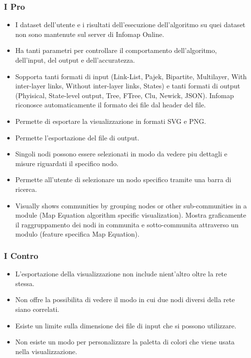 \documentclass[a4paper,12pt]{report}
\begin{document}
			\subsubsection*{I Pro}
				\begin{itemize}
					\item I dataset dell'utente e i risultati dell'esecuzione dell'algoritmo su quei dataset non sono mantenute sul server di Infomap Online.
					\item Ha tanti parametri per controllare il comportamento dell'algoritmo, dell'input, del output e dell'accuratezza.
					\item Sopporta tanti formati di input (Link-List, Pajek, Bipartite, Multilayer, With inter-layer links, Without inter-layer links, States) e tanti formati di output (Phyisical, State-level output, Tree, FTree, Clu, Newick, JSON). Infomap riconosce automaticamente il formato dei file dal header del file.
					\item Permette di esportare la visualizzazione in formati SVG e PNG.
					\item Permette l'esportazione del file di output.
					\item Singoli nodi possono essere selezionati in modo da vedere piu dettagli e misure riguardati il specifico nodo.
					\item Permette all'utente di selezionare un nodo specifico tramite una barra di ricerca.
					\item Visually shows communities by grouping nodes or other sub-communities in a module (Map Equation algorithm specific visualization). Mostra graficamente il raggruppamento dei nodi in communita e sotto-communita attraverso un modulo (feature specifica Map Equation).
				\end{itemize}			

			\subsubsection*{I Contro}
				\begin{itemize}
					\item L'esportazione della visualizzazione non include nient'altro oltre la rete stessa.
					\item Non offre la possibilita di vedere il modo in cui due nodi diversi della rete siano correlati.
					\item Esiste un limite sulla dimensione dei file di input che si possono utilizzare.
					\item Non esiste un modo per personalizzare la paletta di colori che viene usata nella visualizzazione.
				\end{itemize}
\end{document}
